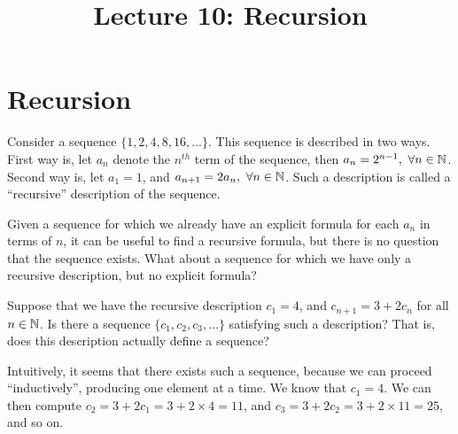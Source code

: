 \documentclass[a4paper,english,12pt]{article}
\title{Lecture 10: Recursion}
\author{}
\begin{document}
\maketitle
\section{Recursion}
Consider a sequence $\{1, 2, 4, 8, 16, \ldots\}$. This sequence is described in two ways. First way is, let $a_n$ denote the $n^{th}$ term of the sequence, then $a_n=2^{n-1},~ \forall n\in \mathbb{N}$. Second way is, let $a_1 =1$, and $a_{n+1}=2a_n,~ \forall n\in \mathbb{N}$. Such a description is called a ``recursive'' description of the sequence.

Given a sequence for which we already have an explicit formula for each $a_n$ in terms of $n$, it can be useful to find a recursive formula, but there is no question that the sequence exists. What about a sequence for which we have only a recursive description, but no explicit formula?

\begin{exmp} Suppose that we have the recursive description $c_1 = 4$, and $c_{n+1} = 3 + 2c_n$ for all $n \in \mathbb{N}$. Is there a sequence $\{c_1, c_2, c_3, \ldots \}$ satisfying such a description? That is, does this description actually define a sequence? 
\end{exmp}
\begin{rem}
Intuitively, it seems that there exists such a sequence, because we can proceed ``inductively'', producing one element at a time. We know that $c_1 = 4$. We can then compute $c_2 = 3 + 2 c_1 = 3 + 2 \times 4 = 11$, and $c_3 = 3 + 2c_2 = 3 + 2 \times 11 = 25$, and so on. 
\end{rem}
\end{document}

